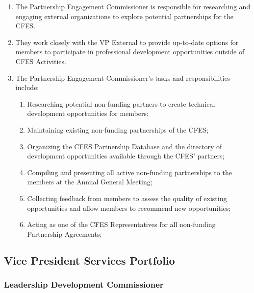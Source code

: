 \begin{enumerate}
 \item
  The Partnership Engagement Commissioner is responsible for researching and engaging external organizations to explore potential partnerships for the CFES.
 \item
  They work closely with the VP External to provide up-to-date options for members to participate in professional development opportunities outside of CFES Activities.
 \item
  The Partnership Engagement Commissioner’s tasks and responsibilities include:
  \begin{enumerate}
   \item
    Researching potential non-funding partners to create technical development opportunities for members;
   \item
    Maintaining existing non-funding partnerships of the CFES;
   \item
    Organizing the CFES Partnership Database and the directory of development opportunities available through the CFES’ partners;
   \item
    Compiling and presenting all active non-funding partnerships to the members at the Annual General Meeting;
   \item
    Collecting feedback from members to assess the quality of existing opportunities and allow members to recommend new opportunities;
   \item
    Acting as one of the CFES Representatives for all non-funding Partnership Agreements;
  \end{enumerate}
\end{enumerate}

\subsection{Vice President Services Portfolio}
\label{vps-portfolio}

\subsubsection{Leadership Development Commissioner}
\label{leadership-development-commissioner}

